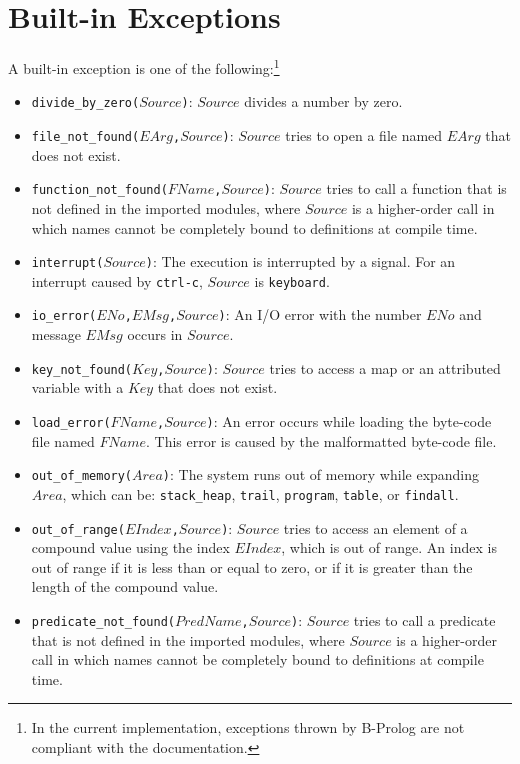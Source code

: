 \section{Built-in Exceptions}
A built-in exception is one of the following:\footnote{In the current implementation, exceptions thrown by B-Prolog are not compliant with the documentation.}
\begin{itemize}
\item \texttt{divide\_by\_zero($Source$)}: $Source$ divides a number by zero.
\item \texttt{file\_not\_found($EArg$,$Source$)}: $Source$ tries to open a file named $EArg$ that does not exist.
\item \texttt{function\_not\_found($FName$,$Source$)}: $Source$ tries to call a function that is not defined in the imported modules, where $Source$ is a higher-order call in which names cannot be completely bound to definitions at compile time.
\item \texttt{interrupt($Source$)}: The execution is interrupted by a signal. For an interrupt caused by \texttt{ctrl-c}, $Source$ is \texttt{keyboard}.
\item \texttt{io\_error($ENo$,$EMsg$,$Source$)}: An I/O error with the number $ENo$ and message $EMsg$ occurs in $Source$.
\item \texttt{key\_not\_found($Key$,$Source$)}: $Source$ tries to access a map or an attributed variable with a $Key$ that does not exist.
\item \texttt{load\_error($FName$,$Source$)}: An error occurs while loading the byte-code file named $FName$.  This error is caused by the malformatted byte-code file.
\item \texttt{out\_of\_memory($Area$)}: The system runs out of memory while expanding $Area$, which can be: \texttt{stack\_heap}, \texttt{trail}, \texttt{program}, \texttt{table}, or \texttt{findall}.
\item \texttt{out\_of\_range($EIndex$,$Source$)}: $Source$ tries to access an element of a compound value using the index $EIndex$, which is out of range.  An index is out of range if it is less than or equal to zero, or if it is greater than the length of the compound value.
\item \texttt{predicate\_not\_found($PredName$,$Source$)}: $Source$ tries to call a predicate that is not defined in the imported modules, where $Source$ is a higher-order call in which names cannot be completely bound to definitions at compile time.

\end{itemize}
